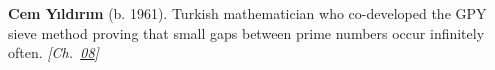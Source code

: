 \textbf{Cem Yıldırım} (b. 1961). Turkish mathematician who co-developed the GPY sieve method proving that small gaps between prime numbers occur infinitely often. \emph{[Ch.~\hyperref[ch:boundedprimegaps]{08}]}

